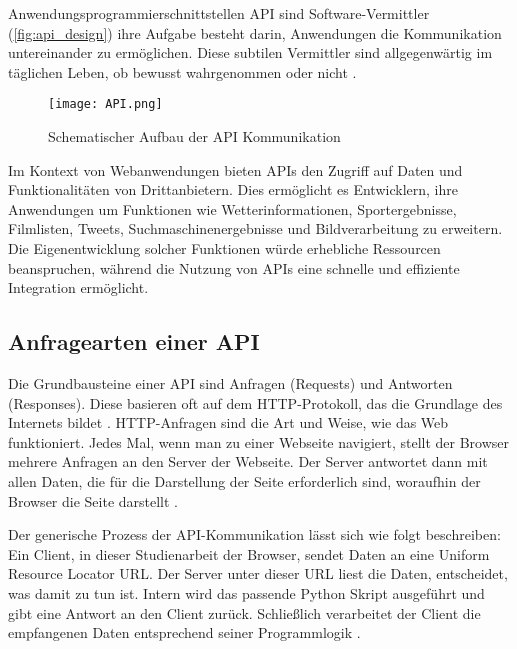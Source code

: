 Anwendungsprogrammierschnittstellen \ac{API} sind Software-Vermittler (\autoref{fig:api_design}) ihre Aufgabe besteht darin, Anwendungen die Kommunikation untereinander zu ermöglichen. 
Diese subtilen Vermittler sind allgegenwärtig im täglichen Leben, ob bewusst wahrgenommen oder nicht \cite{pykes_programmieren_nodate}.

\begin{figure}[h]
    \centering
    \texttt{[image: API.png]}
    \caption{Schematischer Aufbau der API Kommunikation}
    \label{fig:api_design}
\end{figure}

Im Kontext von Webanwendungen bieten \ac{API}s den Zugriff auf Daten und Funktionalitäten von Drittanbietern. 
Dies ermöglicht es Entwicklern, ihre Anwendungen um Funktionen wie Wetterinformationen, Sportergebnisse, Filmlisten, Tweets, Suchmaschinenergebnisse und Bildverarbeitung zu erweitern. 
Die Eigenentwicklung solcher Funktionen würde erhebliche Ressourcen beanspruchen, während die Nutzung von APIs eine schnelle und effiziente Integration ermöglicht\cite{digital_ocean_llc_erste_nodate}.

\subsection{Anfragearten einer API} \label{subsec:anfragearten_einer_api}  %

Die Grundbausteine einer \Ac{API} sind Anfragen (Requests) und Antworten (Responses). Diese basieren oft auf dem \ac{HTTP}-Protokoll, das die Grundlage des Internets bildet \cite{software_mittelstand_erste_nodate}. 
\ac{HTTP}-Anfragen sind die Art und Weise, wie das Web funktioniert. Jedes Mal, wenn man zu einer Webseite navigiert, stellt der Browser mehrere Anfragen an den Server der Webseite. Der Server antwortet dann mit allen Daten, die für die Darstellung der Seite erforderlich sind, woraufhin der Browser die Seite darstellt \cite{digital_ocean_llc_erste_nodate}.

Der generische Prozess der \Ac{API}-Kommunikation lässt sich wie folgt beschreiben: Ein Client, in dieser Studienarbeit der Browser, sendet Daten an eine Uniform Resource Locator \ac{URL}. Der Server unter dieser \ac{URL} liest die Daten, entscheidet, was damit zu tun ist. Intern wird das passende Python Skript ausgeführt und gibt eine Antwort an den Client zurück. Schließlich verarbeitet der Client die empfangenen Daten entsprechend seiner Programmlogik \cite{digital_ocean_llc_erste_nodate}.

